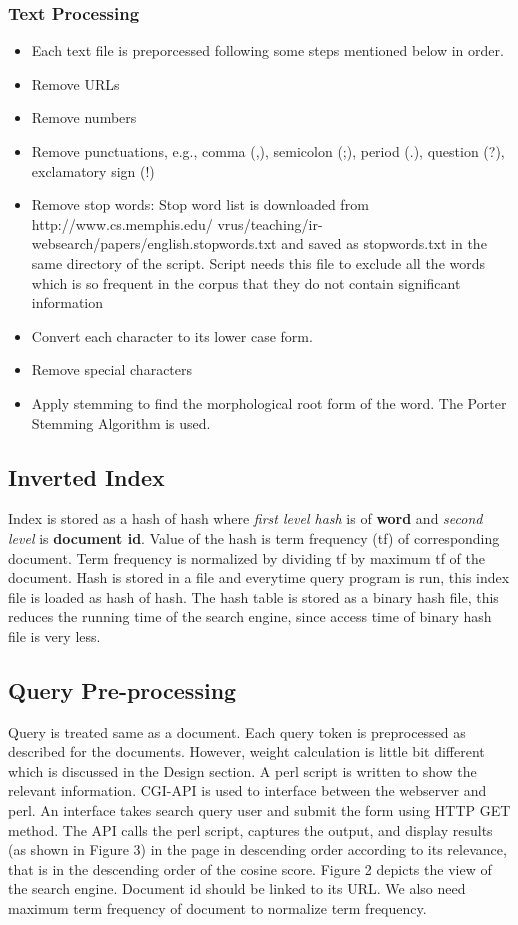 \subsubsection{Text Processing}
\begin{itemize}
\item Each text file is preporcessed following some steps mentioned below in order.
\item Remove URLs
\item Remove numbers
\item Remove punctuations, e.g., comma (,), semicolon (;), period (.), question (?), exclamatory
sign (!)
\item Remove stop words: Stop word list is downloaded from http://www.cs.memphis.edu/
vrus/teaching/ir-websearch/papers/english.stopwords.txt and saved as stopwords.txt in
the same directory of the script. Script needs this file to exclude all the words which is so
frequent in the corpus that they do not contain significant information
\item Convert each character to its lower case form.
\item Remove special characters
\item Apply stemming to find the morphological root form of the word. The Porter Stemming Algorithm is used.
\end{itemize}

\subsection{Inverted Index}
Index is stored as a hash of hash where \textit{first level hash} is of \textbf{word} and \textit{second level} is \textbf{document id}. Value of the hash is term frequency (tf) of corresponding document. Term frequency is normalized by dividing tf by maximum tf of the document. Hash is stored in a file and everytime query program is run, this index file is loaded as hash of hash. The hash table is stored as a binary hash file, this reduces the running time of the search engine, since access time of binary hash file is very less.

\subsection{Query Pre-processing}
Query is treated same as a document. Each query token is preprocessed as described for the
documents. However, weight calculation is little bit different which is discussed in the Design
section. A perl script is written to show the relevant information. CGI-API is used to interface
between the webserver and perl. An interface takes search query user and submit the form using
HTTP GET method. The API calls the perl script, captures the output, and display results (as
shown in Figure 3) in the page in descending order according to its relevance, that is in the
descending order of the cosine score. Figure 2 depicts the view of the search engine. Document
id should be linked to its URL. We also need maximum term frequency of document to
normalize term frequency.